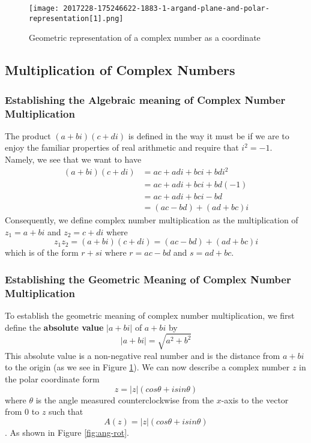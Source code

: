 \documentclass{turabian-researchpaper}
\begin{document}
\begin{figure}[H] 
    \centering
    \texttt{[image: 2017228-175246622-1883-1-argand-plane-and-polar-representation[1].png]} 
    \caption{Geometric representation of a complex number as a coordinate}
    \label{fig:complex-num-point} 
\end{figure}



\subsection{Multiplication of Complex Numbers}  

\subsubsection{Establishing the Algebraic meaning of Complex Number Multiplication}\cite[p.$\Tilde{12-13}$]{Fraleigh2003}

The product $(a+bi)(c+di)$ is defined in the way it must be if we are to enjoy the familiar properties of real arithmetic and require that \(i^2 = -1\). \\ 
Namely, we see that we want to have 
\begin{align*}
    (a+bi)(c+di) &= ac + adi + bci + bdi^2 \\
                 &= ac + adi + bci + bd(-1) \\
                 &= ac + adi + bci - bd \\
                 &= (ac - bd) + (ad + bc)i
\end{align*}
Consequently, we define complex number multiplication as the multiplication of $z_1 = a + bi$ and $z_2 = c + di$ where 
\[z_1z_2 = (a+bi)(c+di) = (ac - bd) + (ad + bc)i\]
which is of the form $r + si$ where $r = ac - bd$ and $s = ad + bc$. 
\subsubsection{Establishing the Geometric Meaning of Complex Number Multiplication}\cite[p.$\Tilde{13-14}$]{Fraleigh2003} 
To establish the geometric meaning of complex number multiplication, we first define the \textbf{absolute value} $|a + bi|$ of \(a + bi\) by \[|a + bi| = \sqrt{a^2 + b^2}\] This absolute value is a non-negative real number and is the distance from \(a + bi\) to the origin (as we see in Figure \ref{fig:complex-num-point}). We can now describe a complex number \(z\) in the polar coordinate form \[z = |z|(cos\theta + isin\theta)\] where \(\theta\) is the angle measured counterclockwise from the \(x\)-axis to the vector from \(0\) to \(z\) such that $$A(z) = |z|(cos\theta + isin\theta)$$.  As shown in Figure \ref{fig:ang-rot}. 
\end{document}
